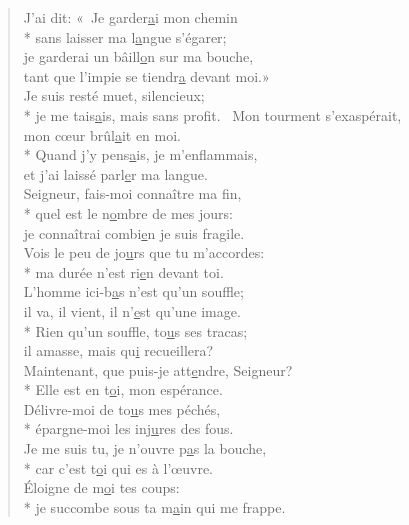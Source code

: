
\begin{verse}
J’ai dit: « Je garder\underline{a}i mon chemin \\*
sans laisser ma l\underline{a}ngue s’égarer; \\
je garderai un bâill\underline{o}n sur ma bouche, \\
tant que l’impie se tiendr\underline{a} devant moi.» \\

Je suis resté muet, silencieux; \\*
je me tais\underline{a}is, mais sans profit.~\psalmstar
Mon tourment s’exaspérait, \\
mon cœur brûl\underline{a}it en moi. \\*
Quand j’y pens\underline{a}is, je m’enflammais, \\
et j’ai laissé parl\underline{e}r ma langue. \\

Seigneur, fais-moi connaître ma fin, \\*
quel est le n\underline{o}mbre de mes jours: \\
je connaîtrai combi\underline{e}n je suis fragile. \\
Vois le peu de jo\underline{u}rs que tu m’accordes: \\*
ma durée n’est ri\underline{e}n devant toi. \\

L’homme ici-b\underline{a}s n’est qu’un souffle; \\
il va, il vient, il n’\underline{e}st qu’une image. \\*
Rien qu’un souffle, to\underline{u}s ses tracas; \\
il amasse, mais qu\underline{i} recueillera? \\

Maintenant, que puis-je att\underline{e}ndre, Seigneur? \\*
Elle est en t\underline{o}i, mon espérance. \\
Délivre-moi de to\underline{u}s mes péchés, \\*
épargne-moi les inj\underline{u}res des fous. \\

Je me suis tu, je n’ouvre p\underline{a}s la bouche, \\*
car c’est t\underline{o}i qui es à l’œuvre. \\
Éloigne de m\underline{o}i tes coups: \\*
je succombe sous ta m\underline{a}in qui me frappe. \\


\end{verse}
